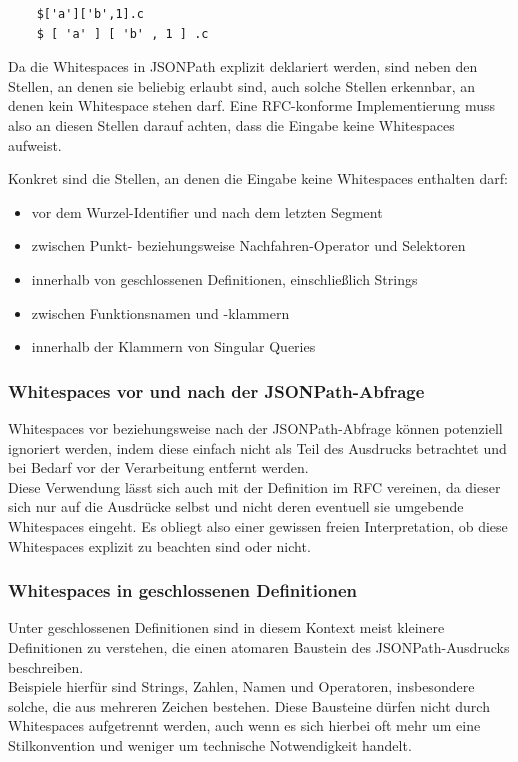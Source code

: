 \documentclass[oneside]{ausarbeitung}
\begin{document}
\begin{lstlisting}
	$['a']['b',1].c
	$ [ 'a' ] [ 'b' , 1 ] .c
\end{lstlisting}
		
Da die Whitespaces in JSONPath explizit deklariert werden, sind neben den Stellen, an denen sie beliebig erlaubt sind, auch solche Stellen erkennbar, an denen kein Whitespace stehen darf. Eine RFC-konforme Implementierung muss also an diesen Stellen darauf achten, dass die Eingabe keine Whitespaces aufweist. 
	
Konkret sind die Stellen, an denen die Eingabe keine Whitespaces enthalten darf:
	
\begin{itemize}
	\item vor dem Wurzel-Identifier und nach dem letzten Segment
	\item zwischen Punkt- beziehungsweise Nachfahren-Operator und Selektoren
	\item innerhalb von geschlossenen Definitionen, einschließlich Strings
	\item zwischen Funktionsnamen und -klammern
	\item innerhalb der Klammern von Singular Queries
\end{itemize}
	
	
	
\subsubsection{Whitespaces vor und nach der JSONPath-Abfrage}
	
Whitespaces vor beziehungsweise nach der JSONPath-Abfrage können potenziell ignoriert werden, indem diese einfach nicht als Teil des Ausdrucks betrachtet und bei Bedarf vor der Verarbeitung entfernt werden. \\
Diese Verwendung lässt sich auch mit der Definition im RFC vereinen, da dieser sich nur auf die Ausdrücke selbst und nicht deren eventuell sie umgebende Whitespaces eingeht. Es obliegt also einer gewissen freien Interpretation, ob diese Whitespaces explizit zu beachten sind oder nicht. 
	
	
	
\subsubsection{Whitespaces in geschlossenen Definitionen}
	
Unter geschlossenen Definitionen sind in diesem Kontext meist kleinere Definitionen zu verstehen, die einen atomaren Baustein des JSONPath-Ausdrucks beschreiben. \\
Beispiele hierfür sind Strings, Zahlen, Namen und Operatoren, insbesondere solche, die aus mehreren Zeichen bestehen. Diese Bausteine dürfen nicht durch Whitespaces aufgetrennt werden, auch wenn es sich hierbei oft mehr um eine Stilkonvention und weniger um technische Notwendigkeit handelt.
	
\end{document}
